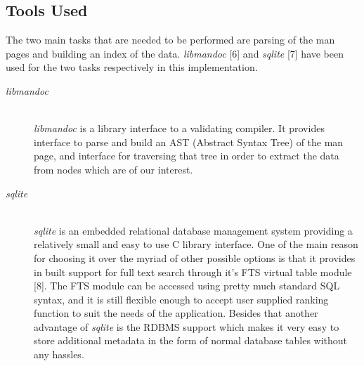 \documentclass[titlepage, a4paper, 12pt]{article}
\begin{document}
\subsection{Tools Used}
The two main tasks that are needed to be performed are parsing of the man pages
and building an index of the data. \textit{libmandoc} [6]
and \textit{sqlite} [7] have been used for the two tasks respectively in this
implementation.
\begin{description}
\item[\textit{libmandoc}] \hfill \\
\textit{libmandoc} is a library interface to a validating compiler. It provides
interface to parse and build an AST (Abstract Syntax Tree) of the man page, 
and interface for traversing that tree in order to extract the data from nodes
which are of our interest.
\end{description}
\begin{description}
\item[\textit{sqlite}] \hfill \\
\textit{sqlite} is an embedded relational database management system providing a
relatively small and easy to use C library interface. One of the main reason
for choosing it over the myriad of other possible options is that it provides
in built support for full text search through it's FTS virtual table module [8].
The FTS module can be accessed using pretty much standard SQL syntax, and it is
still flexible enough to accept user supplied ranking function to suit the needs
of the application. Besides that another advantage of \textit{sqlite} is the
RDBMS support which makes it very easy to store additional metadata in the form
of normal database tables without any hassles.
\end{description}
\end{document}
